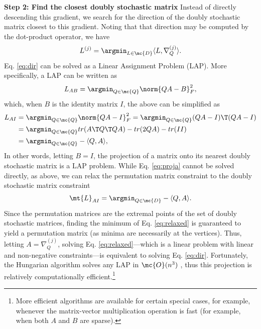 \documentclass[10pt,journal,cspaper,compsoc]{IEEEtran}
\begin{document}
\textbf{Step 2: Find the closest doubly stochastic matrix} Instead of directly descending this gradient, we search for the direction of the doubly stochastic matrix closest to this gradient. Noting that that direction may be computed by the dot-product operator, we have
\begin{align}\label{eq:dir}
	L^{(j)} = \argmin_{L \in \mc{D}} \langle L, \nabla_Q^{(j)} \rangle. %
\end{align}
Eq. \eqref{eq:dir} can be solved as a Linear Assignment Problem (LAP).  More specifically, a LAP can be written as
\begin{align} \label{eq:LAP}
	L_{AB} = \argmin_{Q \in \mc{Q}} \norm{QA - B }^2_F,
\end{align}
which, when $B$ is the identity matrix $I$, the above can be simplified as
\begin{align} \label{eq:proja}
	L_{AI} &=\argmin_{Q \in \mc{Q}} \norm{QA - I}_F^2 
	= \argmin_{Q \in \mc{Q}} (QA-I)\T (QA-I) 
	\nonumber\\ &=\argmin_{Q \in \mc{Q}} tr (A\T Q\T QA) - tr(2QA) - tr(II) 
	\nonumber\\ &
	= \argmin_{Q \in \mc{Q}}  -\langle Q, A \rangle,
\end{align}
In other words, letting $B=I$, the projection of a matrix onto its nearest doubly stochastic matrix is a LAP problem.  While Eq. \eqref{eq:proja} cannot be solved directly, as above, we can relax the permutation matrix constraint to the doubly stochastic matrix constraint
\begin{align}\label{eq:relaxed}
	\mt{L}_{AI} = \argmin_{Q\in\mc{D}} -\langle Q, A \rangle. 
\end{align}
Since the permutation matrices are the extremal points of the set of doubly stochastic matrices, finding the minimum of Eq. \eqref{eq:relaxed} is guaranteed to yield a permutation matrix (as minima are necessarily at the vertices).  Thus, letting $A=\nabla_Q^{(j)}$, solving Eq. \eqref{eq:relaxed}---which is a linear problem with linear and non-negative constraints---is equivalent to solving Eq. \eqref{eq:dir}. 
Fortunately, the Hungarian algorithm solves any LAP in $\mc{O}(n^3)$ \cite{Burkard2009}, thus this projection is relatively computationally efficient.\footnote{More efficient algorithms are available for certain special cases, for example, whenever the matrix-vector multiplication operation is fast (for example, when both $A$ and $B$ are sparse).}
\end{document}

